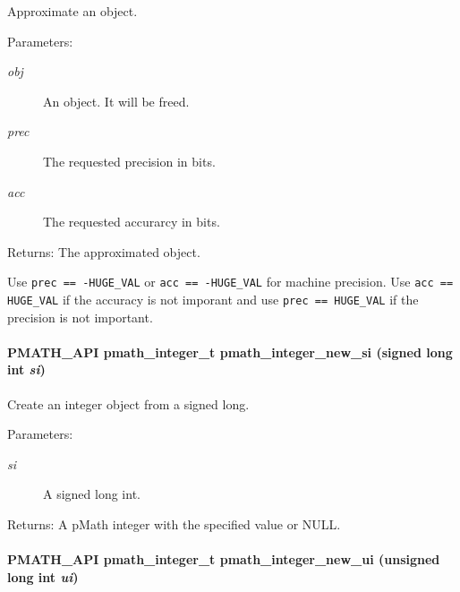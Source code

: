 Approximate an object. 

\begin{Desc}
\item[Parameters:]
\begin{description}
\item[{\em obj}]An object. It will be freed. \item[{\em prec}]The requested precision in bits. \item[{\em acc}]The requested accurarcy in bits. \end{description}
\end{Desc}
\begin{Desc}
\item[Returns:]The approximated object.\end{Desc}
Use {\tt prec == -HUGE\_\-VAL} or {\tt acc == -HUGE\_\-VAL} for machine precision. Use {\tt acc == HUGE\_\-VAL} if the accuracy is not imporant and use {\tt prec == HUGE\_\-VAL} if the precision is not important. \hypertarget{group__numbers_g34c4815ce444a7dd88a19335098c8c5b}{
\paragraph[{pmath\_\-integer\_\-new\_\-si}]{\setlength{\rightskip}{0pt plus 5cm}PMATH\_\-API {\bf pmath\_\-integer\_\-t} pmath\_\-integer\_\-new\_\-si (signed long int {\em si})}\hfill}
\label{group__numbers_g34c4815ce444a7dd88a19335098c8c5b}


Create an integer object from a signed long. 

\begin{Desc}
\item[Parameters:]
\begin{description}
\item[{\em si}]A signed long int. \end{description}
\end{Desc}
\begin{Desc}
\item[Returns:]A pMath integer with the specified value or NULL. \end{Desc}
\hypertarget{group__numbers_ga7704c11e6f72b8403db246f6862d4c6}{
\paragraph[{pmath\_\-integer\_\-new\_\-ui}]{\setlength{\rightskip}{0pt plus 5cm}PMATH\_\-API {\bf pmath\_\-integer\_\-t} pmath\_\-integer\_\-new\_\-ui (unsigned long int {\em ui})}\hfill}
\label{group__numbers_ga7704c11e6f72b8403db246f6862d4c6}


